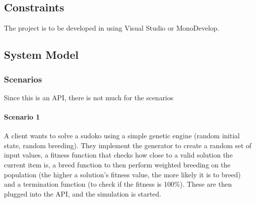 \subsection{Constraints}
The project is to be developed in \csharp using Visual Studio or MonoDevelop.

\subsection{System Model}

\subsubsection{Scenarios}
Since this is an API, there is not much for the scenarios
\paragraph{Scenario 1}
A client wants to solve a sudoko using a simple genetic engine (random initial state, random breeding). They implement the generator to create a random set of input values, a fitness function that checks how close to a valid solution the current item is, a breed function to then perform weighted breeding on the population (the higher a solution's fitness value, the more likely it is to breed) and a termination function (to check if the fitness is 100\%).
These are then plugged into the API, and the simulation is started.

